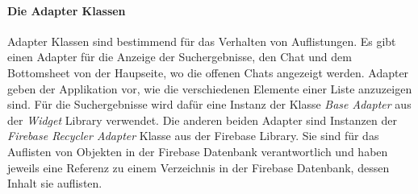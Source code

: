 \documentclass[a4paper,11pt]{report}
\begin{document}
				\paragraph{Die Adapter Klassen}
				Adapter Klassen sind bestimmend für das Verhalten von Auflistungen. Es gibt einen Adapter für die Anzeige der Suchergebnisse, den Chat und dem Bottomsheet von der Haupseite, wo die offenen Chats angezeigt werden. Adapter geben der Applikation vor, wie die verschiedenen Elemente einer Liste anzuzeigen sind. Für die Suchergebnisse wird dafür eine Instanz der Klasse \emph{Base Adapter} aus der \emph{Widget} Library verwendet. Die anderen beiden Adapter sind Instanzen der \emph{Firebase Recycler Adapter} Klasse aus der Firebase Library. Sie sind für das Auflisten von Objekten in der Firebase Datenbank verantwortlich und haben jeweils eine Referenz zu einem Verzeichnis in der Firebase Datenbank, dessen Inhalt sie auflisten.
\end{document}
